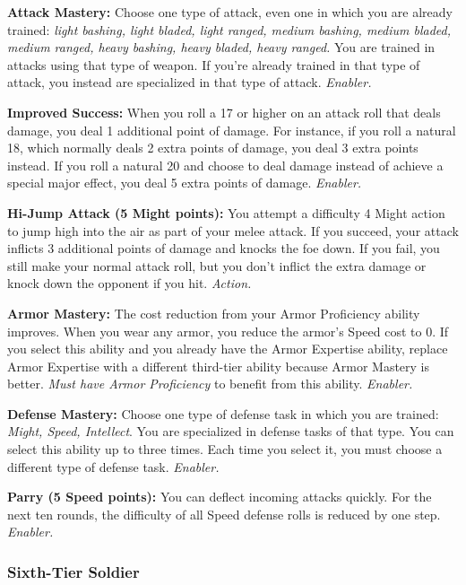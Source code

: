 \documentclass[a4paper,10pt,final,twocolumn,oneside]{book}
\newcommand{\itemAbility}[2]{\textcolor{25gray}{\textbullet\textbf{ #1:}}{ #2}\par}
\newcommand{\enabler}{\textit{ Enabler.}}
\newcommand{\action}{\textit{ Action.}}
\begin{document}
\itemAbility{Attack Mastery}{Choose one type of attack, even one in which you are already trained: \textit{light bashing, light bladed, light ranged, medium bashing, medium bladed, medium ranged, heavy bashing, heavy bladed, heavy ranged.} You are trained in attacks using that type of weapon. If you’re already trained in that type of attack, you instead are specialized in that type of attack.\enabler}

\itemAbility{Improved Success}{When you roll a 17 or higher on an attack roll that deals damage, you deal 1 additional point of damage. For instance, if you roll a natural 18, which normally deals 2 extra points of damage, you deal 3 extra points instead. If you roll a natural 20 and choose to deal damage instead of achieve a special major effect, you deal 5 extra points of damage.\enabler}

\itemAbility{Hi-Jump Attack (5 Might points)}{You attempt a difficulty 4 Might action to jump high into the air as part of your melee attack. If you succeed, your attack inflicts 3 additional points of damage and knocks the foe down. If you fail, you still make your normal attack roll, but you don’t inflict the extra damage or knock down the opponent if you hit.\action}

\itemAbility{Armor Mastery}{The cost reduction from your Armor Proficiency ability improves. When you wear any armor, you reduce the armor’s Speed cost to 0. If you select this ability and you already have the Armor Expertise ability, replace Armor Expertise with a different third-tier ability because Armor Mastery is better. \textit{Must have Armor Proficiency} to benefit from this ability.\enabler}

\itemAbility{Defense Mastery}{Choose one type of defense task in which you are trained: \textit{Might, Speed, Intellect}. You are specialized in defense tasks of that type. You can select this ability up to three times. Each time you select it, you must choose a different type of defense task.\enabler}

\itemAbility{Parry (5 Speed points)}{You can deflect incoming attacks quickly. For the next ten rounds, the difficulty of all Speed defense rolls is reduced by one step.\enabler}


\subsubsection*{Sixth-Tier Soldier}
\label{subsub:soldierSixthTier}
\end{document}
